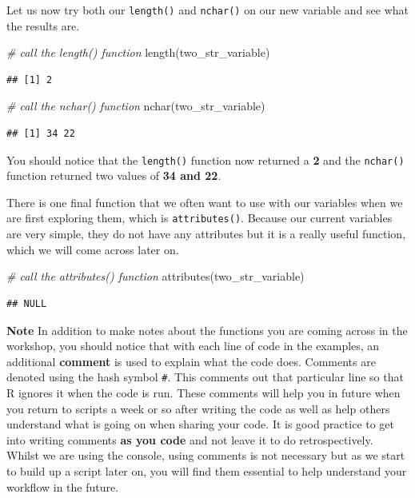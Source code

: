 \documentclass[
]{book}
\newenvironment{Shaded}{\begin{snugshade}}{\end{snugshade}}
\newcommand{\CommentTok}[1]{\textcolor[rgb]{0.56,0.35,0.01}{\textit{#1}}}
\newcommand{\FunctionTok}[1]{\textcolor[rgb]{0.00,0.00,0.00}{#1}}
\newcommand{\NormalTok}[1]{#1}
\begin{document}
Let us now try both our \texttt{length()} and \texttt{nchar()} on our new variable and see what the results are.

\begin{Shaded}
\begin{Highlighting}[]
\CommentTok{\# call the length() function}
\FunctionTok{length}\NormalTok{(two\_str\_variable)}
\end{Highlighting}
\end{Shaded}

\begin{verbatim}
## [1] 2
\end{verbatim}

\begin{Shaded}
\begin{Highlighting}[]
\CommentTok{\# call the nchar() function}
\FunctionTok{nchar}\NormalTok{(two\_str\_variable)}
\end{Highlighting}
\end{Shaded}

\begin{verbatim}
## [1] 34 22
\end{verbatim}

You should notice that the \texttt{length()} function now returned a \textbf{2} and the \texttt{nchar()} function returned two values of \textbf{34 and 22}.

There is one final function that we often want to use with our variables when we are first exploring them, which is \texttt{attributes()}. Because our current variables are very simple, they do not have any attributes but it is a really useful function, which we will come across later on.

\begin{Shaded}
\begin{Highlighting}[]
\CommentTok{\# call the attributes() function}
\FunctionTok{attributes}\NormalTok{(two\_str\_variable)}
\end{Highlighting}
\end{Shaded}

\begin{verbatim}
## NULL
\end{verbatim}

\textbf{Note}
In addition to make notes about the functions you are coming across in the workshop, you should notice that with each line of code in the examples, an additional \textbf{comment} is used to explain what the code does. Comments are denoted using the hash symbol \texttt{\#}. This comments out that particular line so that R ignores it when the code is run. These comments will help you in future when you return to scripts a week or so after writing the code as well as help others understand what is going on when sharing your code. It is good practice to get into writing comments \textbf{as you code} and not leave it to do retrospectively. Whilst we are using the console, using comments is not necessary but as we start to build up a script later on, you will find them essential to help understand your workflow in the future.
\end{document}
